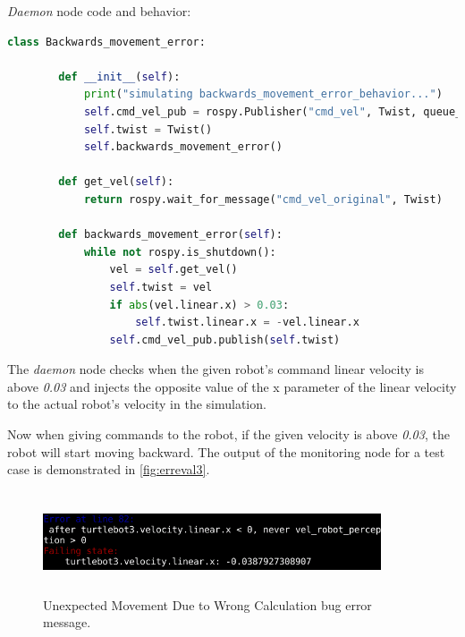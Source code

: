 \textit{Daemon} node code and behavior:

\begin{lstlisting}[language=Python]
    class Backwards_movement_error:

        def __init__(self):
            print("simulating backwards_movement_error_behavior...")
            self.cmd_vel_pub = rospy.Publisher("cmd_vel", Twist, queue_size=1)
            self.twist = Twist()
            self.backwards_movement_error()

        def get_vel(self):
            return rospy.wait_for_message("cmd_vel_original", Twist)

        def backwards_movement_error(self):
            while not rospy.is_shutdown():
                vel = self.get_vel()
                self.twist = vel
                if abs(vel.linear.x) > 0.03:
                    self.twist.linear.x = -vel.linear.x
                self.cmd_vel_pub.publish(self.twist)
\end{lstlisting}

The \textit{daemon} node checks when the given robot's command linear velocity is above \textit{0.03} and injects the opposite value of the x parameter of the linear velocity to the actual robot's velocity in the simulation.

Now when giving commands to the robot, if the given velocity is above \textit{0.03}, the robot will start moving backward. The output of the monitoring node for a test case is demonstrated in \autoref{fig:erreval3}.

\begin{figure}[htb]
\begin{center}
\includegraphics[width=10cm,height=3cm,keepaspectratio,]{images/erreval3.png}
\caption{Unexpected Movement Due to Wrong Calculation bug error message.} \label{fig:erreval3}
\end{center}
\end{figure}

